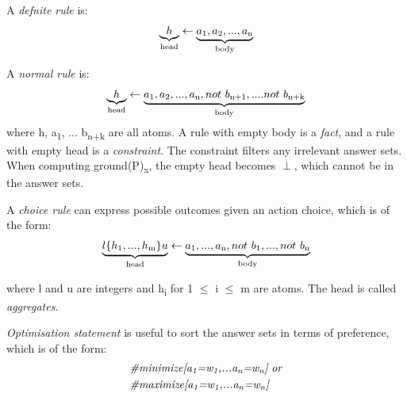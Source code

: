 \documentclass[12pt,twoside]{report}
\theoremstyle{plain}
\theoremstyle{definition}
\begin{document}
A \textit{defnite rule} is: 
\begin{equation}
\begin{split}
\underbrace{h}_\text{head} \leftarrow\underbrace{ a\textsubscript{1}, a\textsubscript{2}, ..., a\textsubscript{n}}_\text{body}
\end{split}
\label{asp_definite_rule}
\end{equation}

A \textit{normal rule} is: 
\begin{equation}
\begin{split}
\underbrace{h}_\text{head} \leftarrow\underbrace{ a\textsubscript{1}, a\textsubscript{2}, ..., a\textsubscript{n}, not \ b\textsubscript{n+1}, ....not \ b\textsubscript{n+k}}_\text{body}
\end{split}
\label{asp_normal_rule}
\end{equation}
where h, a\textsubscript{1}, ... b\textsubscript{n+k} are all atoms.
A rule with empty body is a \textit{fact}, and a rule with empty head is a  \textit{constraint}.
The constraint filters any irrelevant answer sets. When computing ground(P)\textsubscript{x}, the empty head becomes $\perp$, which cannot be in the answer sets.

A \textit{choice rule} can express possible outcomes given an action choice, which is of the form:
\begin{equation}
\begin{split}
\underbrace{l\{h\textsubscript{1},...,h\textsubscript{m}\}u}_\text{head} \leftarrow \underbrace{a\textsubscript{1}, ..., a\textsubscript{n}, not\ b\textsubscript{1}, ..., not\ b\textsubscript{n}}_\text{body}
\end{split}
\label{asp_choice_rule}
\end{equation}

where  l and u are integers and h\textsubscript{i} for 1 $\leq$ i $\leq$ m are atoms. The head is called \textit{aggregates}.

\textit{Optimisation statement} is useful to sort the answer sets in terms of preference, which is of the form:
\begin{equation}
\begin{split}
&\textit{\#minimize[a\textsubscript{1}=w\textsubscript{1},...a\textsubscript{n}=w\textsubscript{n}]} \ \textit{or} \\
&\textit{\#maximize[a\textsubscript{1}=w\textsubscript{1},...a\textsubscript{n}=w\textsubscript{n}]} \\
\end{split}
\label{asp_optimisation_statement}
\end{equation}
\end{document}
